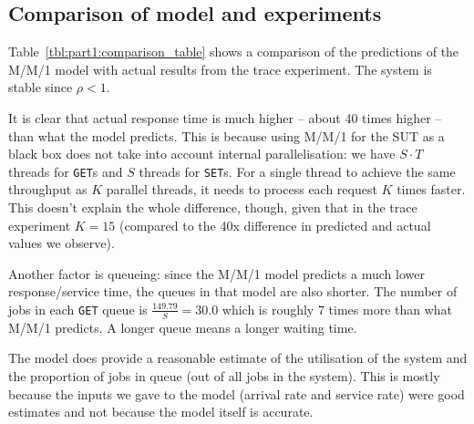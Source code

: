 \documentclass[11pt]{article}
\newcommand{\get}[0]{\texttt{GET}}
\newcommand{\set}[0]{\texttt{SET}}
\newcommand{\linkmain}[1]{\href{https://gitlab.inf.ethz.ch/pungast/asl-fall16-project/blob/master/src/main/java/asl/#1.java}{#1}}
\begin{document}


\subsection{Comparison of model and experiments}




Table~\ref{tbl:part1:comparison_table} shows a comparison of the predictions of the M/M/1 model with actual results from the trace experiment. The system is stable since $\rho < 1$.

It is clear that actual response time is much higher -- about 40 times higher -- than what the model predicts. This is because using M/M/1 for the SUT as a black box does not take into account internal parallelisation: we have $S \cdot T$ threads for \get{}s and $S$ threads for \set{}s. For a single thread to achieve the same throughput as $K$ parallel threads, it needs to process each request $K$ times faster. This doesn't explain the whole difference, though, given that in the trace experiment $K=15$ (compared to the 40x difference in predicted and actual values we observe).

Another factor is queueing: since the M/M/1 model predicts a much lower response/service time, the queues in that model are also shorter. The number of jobs in each \get{} queue is $\frac{149.79}{S} = 30.0$ which is roughly 7 times more than what M/M/1 predicts. A longer queue means a longer waiting time.

The model does provide a reasonable estimate of the utilisation of the system and the proportion of jobs in queue (out of all jobs in the system). This is mostly because the inputs we gave to the model (arrival rate and service rate) were good estimates and not because the model itself is accurate.
\end{document}
